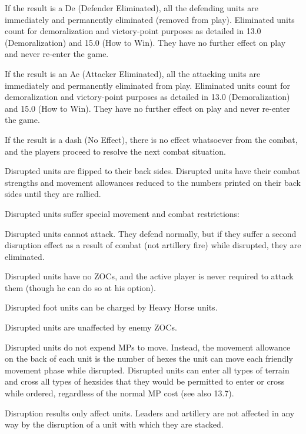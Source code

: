 If the result is a De (Defender Eliminated), all the defending units are immediately and permanently eliminated (removed from play). Eliminated units count for demoralization and victory-point purposes as detailed in 13.0 (Demoralization) and 15.0 (How to Win). They have no further effect on play and never re-enter the game.

 If the result is an Ae (Attacker Eliminated), all the attacking units are immediately and permanently eliminated from play. Eliminated units count for demoralization and victory-point purposes as detailed in 13.0 (Demoralization) and 15.0 (How to Win). They have no further effect on play and never re-enter the game.

 If the result is a dash (No Effect), there is no effect whatsoever from the combat, and the players proceed to resolve the next combat situation.

 Disrupted units are flipped to their back sides. Disrupted units have their combat strengths and movement allowances reduced to the numbers printed on their back sides until they are rallied.

 Disrupted units suffer special movement and combat restrictions:

\begin{tightitems}
  \item Disrupted units cannot attack. They defend normally, but if they suffer a second disruption effect as a result of combat (not artillery fire) while disrupted, they are eliminated.
  \item Disrupted units have no ZOCs, and the active player is never required to attack them (though he can do so at his option).
  \item Disrupted foot units can be charged by Heavy Horse units.
  \item Disrupted units are unaffected by enemy ZOCs.
  \item Disrupted units do not expend MPs to move. Instead, the movement allowance on the back of each unit is the number of hexes the unit can move each friendly movement phase while disrupted. Disrupted units can enter all types of terrain and cross all types of hexsides that they would be permitted to enter or cross while ordered, regardless of the normal MP cost (see also 13.7).
\end{tightitems}

Disruption results only affect units. Leaders and artillery are not affected in any way by the disruption of a unit with which they are stacked.


